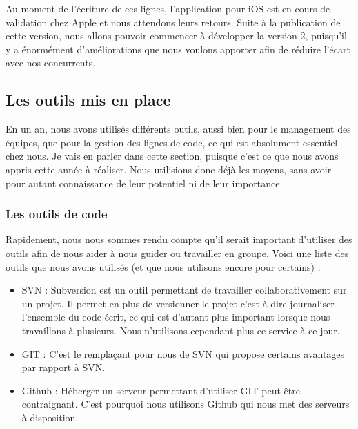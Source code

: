 \documentclass{article}
\begin{document}
		Au moment de l'écriture de ces lignes, l'application pour iOS est en cours de validation chez Apple et nous attendons leurs retours. Suite à la publication de cette version, nous allons pouvoir commencer à développer la version 2, puisqu'il y a énormément d'améliorations que nous voulons apporter afin de réduire l'écart avec nos concurrents. 
		
	\subsection{Les outils mis en place}
	En un an, nous avons utilisés différents outils, aussi bien pour le management des équipes, que pour la gestion des lignes de code, ce qui est absolument essentiel chez nous. Je vais en parler dans cette section, puisque c'est ce que nous avons appris cette année à réaliser. Nous utilisions donc déjà les moyens, sans avoir pour autant connaissance de leur potentiel ni de leur importance.
		\subsubsection{Les outils de code}
		Rapidement, nous nous sommes rendu compte qu'il serait important d'utiliser des outils afin de nous aider à nous guider ou travailler en groupe. Voici une liste des outils que nous avons utilisés (et que nous utilisons encore pour certains) :
			\begin{itemize}
				\item SVN : Subversion est un outil permettant de travailler collaborativement sur un projet. Il permet en plus de versionner le projet c'est-à-dire journaliser l'ensemble du code écrit, ce qui est d'autant plus important lorsque nous travaillons à plusieurs. Nous n'utilisons cependant plus ce service à ce jour.
				\item GIT : C'est le remplaçant pour nous de SVN qui propose certains avantages par rapport à SVN.
				\item Github : Héberger un serveur permettant d'utiliser GIT peut être contraignant. C'est pourquoi nous utilisons Github qui nous met des serveurs à disposition.
			\end{itemize}
		
\end{document}
